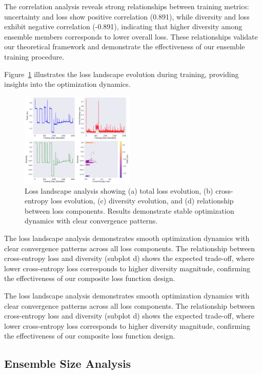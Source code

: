 \documentclass[journal]{IEEEtran}
\begin{document}
The correlation analysis reveals strong relationships between training metrics: uncertainty and loss show positive correlation (0.891), while diversity and loss exhibit negative correlation (-0.891), indicating that higher diversity among ensemble members corresponds to lower overall loss. These relationships validate our theoretical framework and demonstrate the effectiveness of our ensemble training procedure.

Figure~\ref{fig:loss_landscape} illustrates the loss landscape evolution during training, providing insights into the optimization dynamics.

\begin{figure}[t]
\centering
\includegraphics[width=0.48\textwidth]{figures/loss_landscape.pdf}
\caption{Loss landscape analysis showing (a) total loss evolution, (b) cross-entropy loss evolution, (c) diversity evolution, and (d) relationship between loss components. Results demonstrate stable optimization dynamics with clear convergence patterns.}
\label{fig:loss_landscape}
\end{figure}

The loss landscape analysis demonstrates smooth optimization dynamics with clear convergence patterns across all loss components. The relationship between cross-entropy loss and diversity (subplot d) shows the expected trade-off, where lower cross-entropy loss corresponds to higher diversity magnitude, confirming the effectiveness of our composite loss function design.

The loss landscape analysis demonstrates smooth optimization dynamics with clear convergence patterns across all loss components. The relationship between cross-entropy loss and diversity (subplot d) shows the expected trade-off, where lower cross-entropy loss corresponds to higher diversity magnitude, confirming the effectiveness of our composite loss function design.

\subsection{Ensemble Size Analysis}
\end{document}
